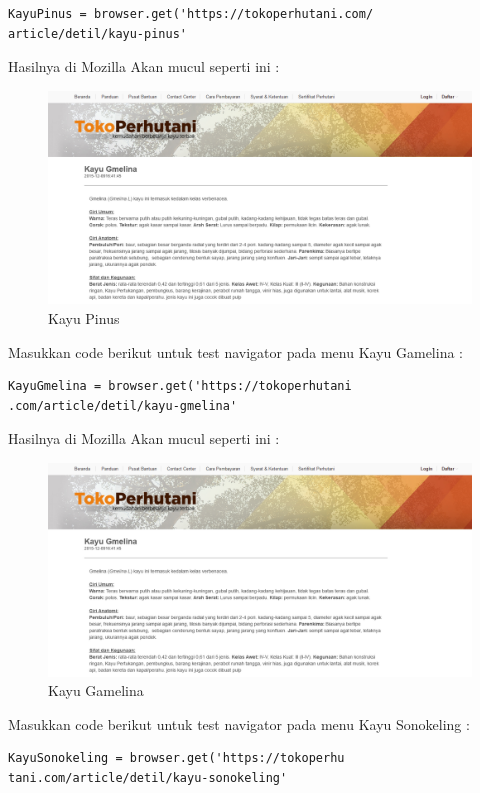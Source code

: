 \begin{verbatim}
KayuPinus = browser.get('https://tokoperhutani.com/
article/detil/kayu-pinus'
\end{verbatim}

Hasilnya  di Mozilla Akan mucul seperti ini :
\begin{figure}[h]
	\centering
	\includegraphics[scale=0.29]{figures/aa}
	\caption{Kayu Pinus}
\end{figure}

Masukkan code berikut untuk test navigator pada menu Kayu Gamelina :
\begin{verbatim}
KayuGmelina = browser.get('https://tokoperhutani
.com/article/detil/kayu-gmelina'
\end{verbatim}

Hasilnya  di Mozilla Akan mucul seperti ini :
\begin{figure}[h]
	\centering
	\includegraphics[scale=0.342]{figures/2kg}
	\caption{Kayu Gamelina}
\end{figure}

Masukkan code berikut untuk test navigator pada menu Kayu Sonokeling :
\begin{verbatim}
KayuSonokeling = browser.get('https://tokoperhu
tani.com/article/detil/kayu-sonokeling'
\end{verbatim}

